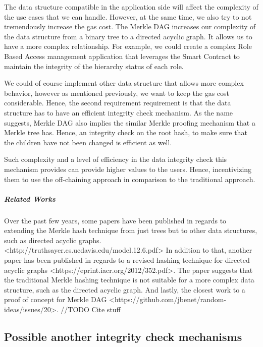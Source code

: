 The data structure compatible in the application side will affect the complexity of the use cases that we can handle. However, at the same time, we also try to not tremendously increase the gas cost. The Merkle DAG increases our complexity of the data structure from a binary tree to a directed acyclic graph. It allows us to have a more complex relationship. For example, we could create a complex Role Based Access management application that leverages the Smart Contract to maintain the integrity of the hierarchy status of each role. 

We could of course implement other data structure that allows more complex behavior, however as mentioned previously, we want to keep the gas cost considerable. Hence, the second requirement requirement is that the data structure has to have an efficient integrity check mechanism. As the name suggests, Merkle DAG also implies the similar Merkle proofing mechanism that a Merkle tree has. Hence, an integrity check on the root hash, to make sure that the children have not been changed is efficient as well. 

Such complexity and a level of efficiency in the data integrity check this mechanism provides can provide higher values to the users. Hence, incentivizing them to use the off-chaining approach in comparison to the traditional approach. 

\subparagraph{Related Works}
Over the past few years, some papers have been published in regards to extending the Merkle hash technique from just trees but to other data structures, such as directed acyclic graphs. <http://truthsayer.cs.ucdavis.edu/model.12.6.pdf> In addition to that, another paper has been published in regards to a revised hashing technique for directed acyclic graphs <https://eprint.iacr.org/2012/352.pdf>. The paper suggests that the traditional Merkle hashing technique is not suitable for a more complex data structure, such as the directed acyclic graph. And lastly, the closest work to a proof of concept for Merkle DAG <https://github.com/jbenet/random-ideas/issues/20>.  //TODO Cite stuff

\subsection{Possible another integrity check mechanisms}

